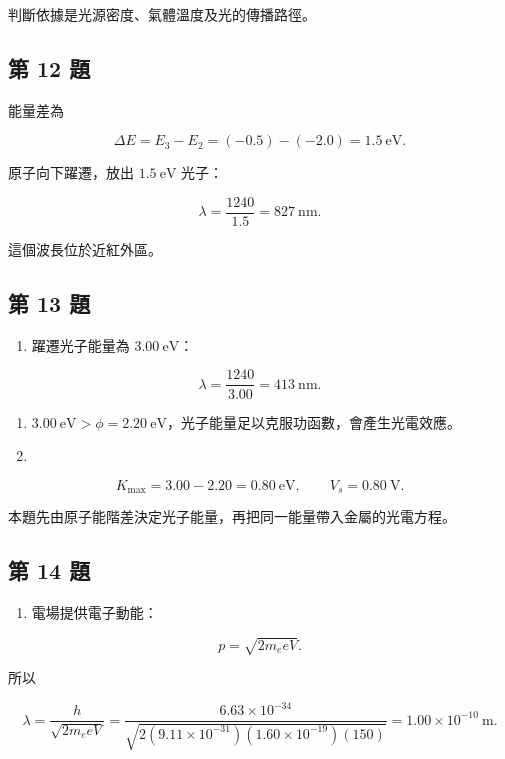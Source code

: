 \documentclass[11pt,a4paper]{article}
\providecommand{\tightlist}{%
  \setlength{\itemsep}{0pt}\setlength{\parskip}{0pt}}
\begin{document}
判斷依據是光源密度、氣體溫度及光的傳播路徑。

\subsection{第 12 題}\label{ux7b2c-12-ux984c}

能量差為

\[
\Delta E=E_3-E_2=(-0.5)-(-2.0)=1.5\ \mathrm{eV}.
\]

原子向下躍遷，放出 \(1.5\ \mathrm{eV}\) 光子：

\[
\lambda=\frac{1240}{1.5}=827\ \mathrm{nm}.
\]

這個波長位於近紅外區。

\subsection{第 13 題}\label{ux7b2c-13-ux984c}

\begin{enumerate}
\def\labelenumi{(\arabic{enumi})}
\tightlist
\item
  躍遷光子能量為 \(3.00\ \mathrm{eV}\)：
\end{enumerate}

\[
\lambda=\frac{1240}{3.00}=413\ \mathrm{nm}.
\]

\begin{enumerate}
\def\labelenumi{(\arabic{enumi})}
\setcounter{enumi}{1}
\item
  \(3.00\ \mathrm{eV}>\phi=2.20\ \mathrm{eV}\)，光子能量足以克服功函數，會產生光電效應。
\item
\end{enumerate}

\[
K_{\max}=3.00-2.20=0.80\ \mathrm{eV},
\qquad
V_s=0.80\ \mathrm V.
\]

本題先由原子能階差決定光子能量，再把同一能量帶入金屬的光電方程。

\subsection{第 14 題}\label{ux7b2c-14-ux984c}

\begin{enumerate}
\def\labelenumi{(\arabic{enumi})}
\tightlist
\item
  電場提供電子動能：
\end{enumerate}

\[
p=\sqrt{2m_e eV}.
\]

所以

\[
\lambda=\frac{h}{\sqrt{2m_e eV}}
=\frac{6.63\times10^{-34}}
{\sqrt{2(9.11\times10^{-31})(1.60\times10^{-19})(150)}}
=1.00\times10^{-10}\ \mathrm m.
\]
\end{document}
